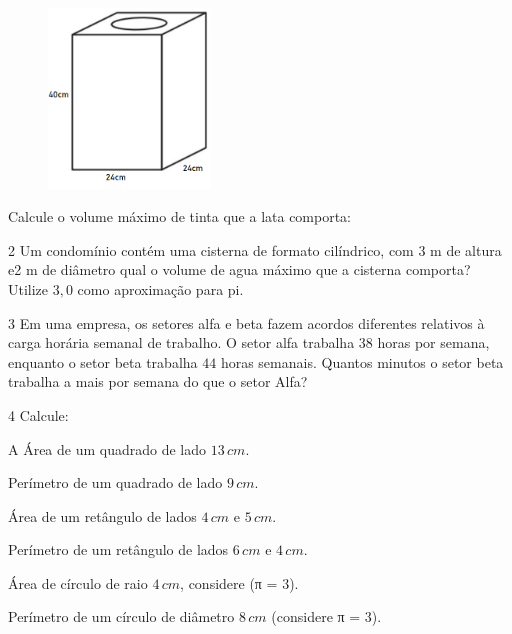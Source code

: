 \begin{figure}[h]
\centering\includegraphics[width=1.69792in,height=1.88115in]{./imgSAEB_6_MAT/media/image95.png}
\end{figure}

Calcule o volume máximo de tinta que a lata comporta:


\num{2}  Um condomínio contém uma cisterna de formato cilíndrico, com $3$ m de
altura e2 m de diâmetro qual o volume de agua máximo que a cisterna
comporta? Utilize $3,0$ como aproximação para pi.


\num{3}  Em uma empresa, os setores alfa e beta fazem acordos diferentes
relativos à carga horária semanal de trabalho. O setor alfa trabalha $38$
horas por semana, enquanto o setor beta trabalha $44$ horas semanais.
Quantos minutos o setor beta trabalha a mais por semana do que o setor
Alfa? 


\num{4} Calcule:

\begin{escolha}
\item A Área de um quadrado de lado $13\,cm$. 
\item Perímetro de um quadrado de lado $9\,cm$. 
\item Área de um retângulo de lados $4\,cm$ e $5\,cm$. 
\item Perímetro de um retângulo de lados $6\,cm$ e $4\,cm$. 
\item Área de círculo de raio $4\,cm$, considere (π = $3$). 
\item Perímetro de um círculo de diâmetro $8\,cm$ (considere π = $3$). 
\end{escolha}

